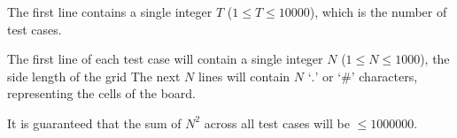 \documentclass{article}
\begin{document}
The first line contains a single integer $T$ ($1 \le T \le 10000$), which is the number of test cases. 

The first line of each test case will contain a single integer $N$ ($1 \le N \le 1000$), the side length of the grid
The next $N$ lines will contain $N$ $\textbf{`.'}$ or $\textbf{`\#'}$ characters, representing the cells of the board.

It is guaranteed that the sum of $N^2$ across all test cases will be $\le 1000000$.
\end{document}
